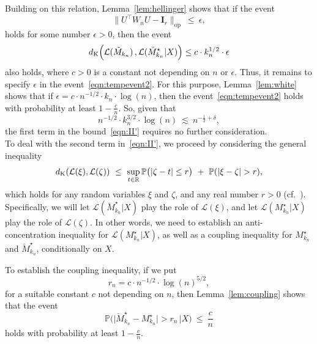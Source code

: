 \documentclass[aos,preprint]{imsart}
\numberwithin{equation}{section}
\theoremstyle{plain}
\newcommand{\R}{\mathbb{R}}
\newcommand{\dK}{d_{\textup{K}}}
\renewcommand{\P}{\mathbb{P}}
\renewcommand{\L}{\mathcal{L}}
\newcommand{\e}{\epsilon}
\newcommand{\ttop}{^{\top}}
\newcommand{\ts}{\textstyle}
\newcommand{\1}{{\bf{1}}}
\newcommand{\0}{\mathbf{0}}
\begin{document}
Building on this relation, Lemma~\ref{lem:hellinger} shows that if the event
 \begin{equation}\label{eqn:tempevent2}
 \|U\ttop W_n U-\mathbf{I}_{r}\|_{\text{op}} \ \leq \ \e,
 \end{equation}
 holds for some number $\e>0$, then the event
\begin{equation}
 \dK\Big(\L(\tilde M_{k_n})\, , \L(\breve M_{k_n}^{\star}|X)\Big) \leq c\cdot  k_n^{1/2} \cdot \e
\end{equation}
also holds, where $c>0$ is a constant not depending on $n$ or $\e$. Thus, it remains to specify $\e$ in the event~\eqref{eqn:tempevent2}. For this purpose, Lemma~\ref{lem:white} shows that if $\e=c \cdot n^{-1/2}\cdot k_n\cdot \log(n)$, then the event~\eqref{eqn:tempevent2} holds with probability at least $1-\frac cn$. 
%
So, given that 
$$n^{-1/2}\cdot k_n^{3/2}\cdot \log(n) \ \lesssim \ n^{-\frac 12+\delta},$$ 
the first term in the bound~\eqref{eqn:II'} requires no further consideration.\\

To deal with the second term in~\eqref{eqn:II'}, we proceed by considering the general inequality
\begin{equation}
\dK(\L(\xi),\L(\zeta)) \ \leq \ \sup_{t\in\R}\P\big(|\zeta-t|\leq r\big)  \ + \  \P(|\xi-\zeta|>r),
\end{equation}
which holds for any random variables $\xi$ and $\zeta$, and any real number $r>0$ (cf.~\citet[Lemma 2.1]{CCK:SPA}). Specifically, we will let $\L(\breve M_{k_n}^{\star}|X)$ play the role of $\L(\xi)$, and let $\L(M_{k_n}^{\star}|X)$ play the role of $\L(\zeta)$. In other words, we need to establish an anti-concentration inequality for $\mathcal{L}(M_{k_n}^{\star}|X)$, as well as a coupling inequality for $ M_{k_n}^{\star}$ and $\breve M_{k_n}^{\star}$, conditionally on $X$.

To establish the coupling inequality, if we put
\begin{equation}
r_n= c \cdot n^{-1/2}\cdot \log(n)^{5/2},
\end{equation}
for a suitable constant $c$ not depending on $n$, then Lemma~\ref{lem:coupling} shows that the event
\begin{equation}\label{eqn:maincouple}
\P\Big(\big|\breve M_{k_n}^{\star} - M_{k_n}^{\star}\big| > r_n\, \Big| X\Big)  \ \leq  \ \ts\frac cn
\end{equation}
holds with probability at least $1-\frac cn$.
\end{document}
